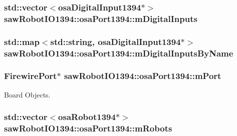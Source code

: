 \subsubsection[{m\+Digital\+Inputs}]{\setlength{\rightskip}{0pt plus 5cm}std\+::vector$<${\bf osa\+Digital\+Input1394}$\ast$$>$ saw\+Robot\+I\+O1394\+::osa\+Port1394\+::m\+Digital\+Inputs\hspace{0.3cm}{\ttfamily [protected]}}\label{classsaw_robot_i_o1394_1_1osa_port1394_ad654d5d0706677161e40b7eb723ed976}
\hypertarget{classsaw_robot_i_o1394_1_1osa_port1394_a02b4d9862a4db5568382fc665d365820}{}
\subsubsection[{m\+Digital\+Inputs\+By\+Name}]{\setlength{\rightskip}{0pt plus 5cm}std\+::map$<$std\+::string, {\bf osa\+Digital\+Input1394}$\ast$$>$ saw\+Robot\+I\+O1394\+::osa\+Port1394\+::m\+Digital\+Inputs\+By\+Name\hspace{0.3cm}{\ttfamily [protected]}}\label{classsaw_robot_i_o1394_1_1osa_port1394_a02b4d9862a4db5568382fc665d365820}
\hypertarget{classsaw_robot_i_o1394_1_1osa_port1394_aa0d8a2385466f6861d9b999f2c73406c}{}
\subsubsection[{m\+Port}]{\setlength{\rightskip}{0pt plus 5cm}Firewire\+Port$\ast$ saw\+Robot\+I\+O1394\+::osa\+Port1394\+::m\+Port\hspace{0.3cm}{\ttfamily [protected]}}\label{classsaw_robot_i_o1394_1_1osa_port1394_aa0d8a2385466f6861d9b999f2c73406c}


Board Objects. 

\hypertarget{classsaw_robot_i_o1394_1_1osa_port1394_a3cb60cf6a18b8e0b91576636cb231ea3}{}
\subsubsection[{m\+Robots}]{\setlength{\rightskip}{0pt plus 5cm}std\+::vector$<${\bf osa\+Robot1394}$\ast$$>$ saw\+Robot\+I\+O1394\+::osa\+Port1394\+::m\+Robots\hspace{0.3cm}{\ttfamily [protected]}}\label{classsaw_robot_i_o1394_1_1osa_port1394_a3cb60cf6a18b8e0b91576636cb231ea3}


